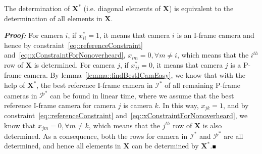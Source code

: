 \begin{mythm}
The determination of $\mathbf{X}^*$ (i.e. diagonal elements of $\mathbf{X}$) is equivalent to the determination of all elements in $\mathbf{X}$.
\label{theorem::determineX}
\end{mythm}
\textbf{\emph{Proof:}}
For camera $i$, if $x_{ii}^* =1$, it means that camera $i$ is an I-frame camera and hence by constraint~\eqref{eq::referenceConstraint} and~\eqref{eq::xConstraintForNonoverheard}, $x_{im}=0, \forall m \neq i$, which means that the $i^{th}$ row of $\mathbf{X}$ is determined.
For camera $j$, if $x_{jj}^* =0$, it means that camera $j$ is a P-frame camera.
By lemma~\ref{lemma::findBestICamEasy}, we know that with the help of $\mathbf{X}^*$, the best reference I-frame camera in $\mathcal{I}^*$ of all remaining P-frame cameras in $\mathcal{P}^*$ can be found in linear time, where we assume that the best reference I-frame camera for camera $j$ is camera $k$.
In this way, $x_{jk}=1$, and by constraint~\eqref{eq::referenceConstraint} and~\eqref{eq::xConstraintForNonoverheard}, we know that $x_{jm}=0, \forall m \neq k$, which means that the $j^{th}$ row of $\mathbf{X}$ is also determined.
As a consequence, both the rows for camera in $\mathcal{I}^*$ and $\mathcal{P}^*$ are all determined, and hence all elements in $\mathbf{X}$ can be determined by $\mathbf{X}^*$.\hfill$\mathsmaller{\mathsmaller{\blacksquare}}$

